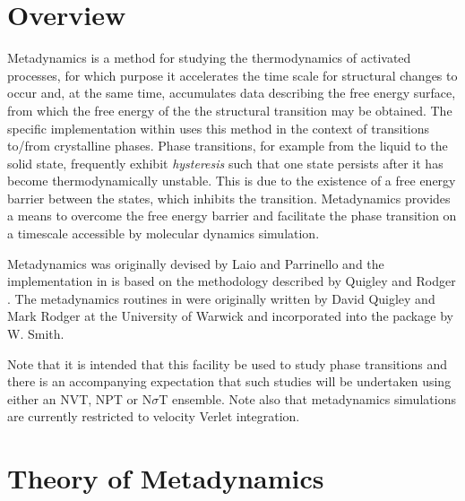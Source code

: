 \section{Overview}

Metadynamics \cite{laio-02a,quigley-09a} is a method for studying the
thermodynamics of activated processes, for which purpose it accelerates the
time scale for structural changes to occur and, at the same time, accumulates
data describing the free energy surface, from which the free energy of the the
structural transition may be obtained. The specific implementation within \D{}
uses this method in the context of transitions to/from crystalline phases.
Phase transitions, for example from the liquid to the solid state, frequently
exhibit {\em hysteresis} such that one state persists after it has become
thermodynamically unstable. This is due to the existence of a free energy
barrier between the states, which inhibits the transition. Metadynamics
provides a means to overcome the free energy barrier and facilitate the phase
transition on a timescale accessible by molecular dynamics simulation.

Metadynamics was originally devised by Laio and Parrinello
\cite{laio-02a} and the implementation in \D{} is based on the methodology
described by Quigley and Rodger \cite{quigley-09a}.
The metadynamics routines in \D{} were originally written by David Quigley and
Mark Rodger at the University of Warwick and incorporated into the package by
W. Smith.  

Note that it is intended that this facility be used to study phase transitions
and there is an accompanying expectation that such studies will be undertaken
using either an NVT, NPT or N$\sigma$T ensemble. Note also that metadynamics
simulations are currently restricted to velocity Verlet integration.

\section{Theory of Metadynamics}
\label{metadtheory}

